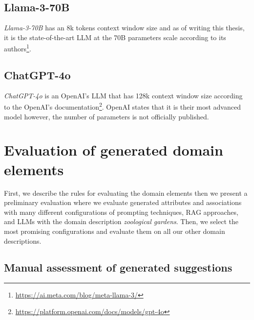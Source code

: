 \subsection{Llama-3-70B}

\emph{Llama-3-70B} has an 8k tokens context window size and as of writing this thesis, it is the state-of-the-art LLM at the 70B parameters scale according to its authors\footnote{\url{https://ai.meta.com/blog/meta-llama-3/}}.


\subsection{ChatGPT-4o}

\emph{ChatGPT-4o} is an OpenAI's LLM that has 128k context window size according to the OpenAI's documentation\footnote{\url{https://platform.openai.com/docs/models/gpt-4o}}. OpenAI states that it is their most advanced model however, the number of parameters is not officially published.


%


\section{Evaluation of generated domain elements}

First, we describe the rules for evaluating the domain elements then we present a preliminary evaluation where we evaluate generated attributes and associations with many different configurations of prompting techniques, RAG approaches, and LLMs with the domain description \textit{zoological gardens}. Then, we select the most promising configurations and evaluate them on all our other domain descriptions.


\subsection{Manual assessment of generated suggestions}

